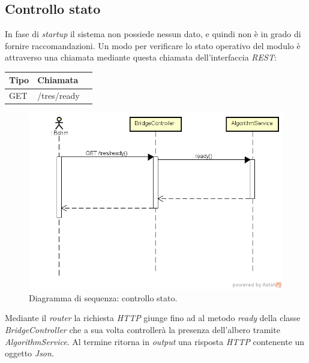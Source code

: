 \subsection{Controllo stato}
In fase di \emph{startup} il sistema non possiede nessun dato, e quindi non è in grado di fornire raccomandazioni. Un modo per verificare lo stato operativo del modulo è attraverso una chiamata mediante questa chiamata dell'interfaccia \emph{REST}:\\
\def\arraystretch{1.5}
\begin{longtable}{|p{2.5cm}|p{5cm}|l|}
\hline
\textbf{Tipo} &	\textbf{Chiamata}	\\\hline
GET		&	/tres/ready		 \\\hline
\end{longtable}
\begin{figure}[h]
\centering
\includegraphics[scale=0.43]{immagini/DScheckstate}
\caption{Diagramma di sequenza: controllo stato.}
\label{fig:seq-controllostato}
\end{figure}
Mediante il \emph{router} la richiesta \emph{HTTP} giunge fino ad al metodo \emph{ready} della classe \emph{BridgeController} che a sua volta controllerà la presenza dell'albero tramite \emph{AlgorithmService}. Al termine ritorna in \emph{output} una risposta \emph{HTTP} contenente un oggetto \emph{Json}.

